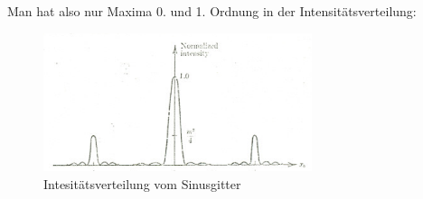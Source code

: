 \begin{enumerate}
Man hat also nur Maxima 0. und 1. Ordnung in der Intensit\"atsverteilung:

\begin{figure}[H]
	\centering \includegraphics[width=0.7\textwidth]{Bilder/Sinusverteilung.jpg}
	\caption{Intesit\"atsverteilung vom Sinusgitter}
\end{figure}


\end{enumerate}















